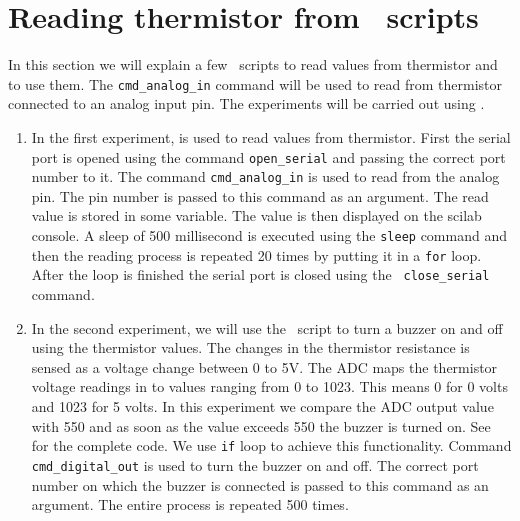 \section {Reading thermistor from \scilab\ scripts}
In this section we will explain a few \scilab\ scripts to read values
from thermistor and to use them.  The {\tt cmd\_analog\_in} command
will be used to read from thermistor connected to an analog input
pin. The experiments will be carried out using \scilab.

\begin{enumerate}
\item In the first experiment,  is used to read
  values from thermistor. First the serial port is opened using the
  command {\tt open\_serial} and passing the correct port number to
  it. The command {\tt cmd\_analog\_in} is used to read from the
  analog pin. The pin number is passed to this command as an
  argument. The read value is stored in some variable. The value is
  then displayed on the scilab console. A sleep of 500 millisecond is
  executed using the {\tt sleep} command and then the reading process
  is repeated 20 times by putting it in a {\tt for} loop. After the
  loop is finished the serial port is closed using the {\tt
    close\_serial} command.

\item In the second experiment, we will use the \scilab\ script to
  turn a buzzer on and off using the thermistor values. The changes in
  the thermistor resistance is sensed as a voltage change between 0 to
  5V. The ADC maps the thermistor voltage readings in to values
  ranging from 0 to 1023. This means 0 for 0 volts and 1023 for 5
  volts. In this experiment we compare the ADC output value with 550
  and as soon as the value exceeds 550 the buzzer is turned on. See
   for the complete code. We use {\tt if}
  loop to achieve this functionality. Command {\tt cmd\_digital\_out}
  is used to turn the buzzer on and off.  The correct port number on
  which the buzzer is connected is passed to this command as an
  argument. The entire process is repeated 500 times.
\end{enumerate}


